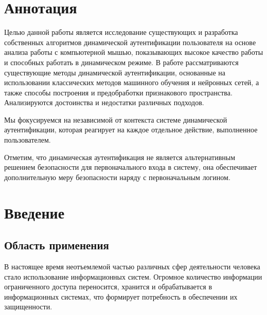 \documentclass[12pt]{article}
\begin{document}
    \setcounter{page}{2}  %

    \tableofcontents
    \newpage


    \onehalfspacing %


    \section{Аннотация}
    \label{sec:Annotation}

    \par Целью данной работы является исследование существующих и разработка собственных алгоритмов динамической аутентификации пользователя на основе анализа работы с компьютерной мышью, показывающих высокое качество работы и способных работать в динамическом режиме. В работе рассматриваются существующие методы динамической аутентификации, основанные на использовании классических методов машинного обучения и нейронных сетей, а также способы построения и предобработки признакового пространства. Анализируются достоинства и недостатки различных подходов.

    \par Мы фокусируемся на независимой от контекста системе динамической аутентификации, которая реагирует на каждое отдельное действие, выполненное пользователем.

    \par Отметим, что динамическая аутентификация не является альтернативным решением безопасности для первоначального входа в систему, она обеспечивает дополнительную меру безопасности наряду с первоначальным логином.

    \newpage



    \section{Введение}
    \label{sec:Intro}

    \subsection{Область применения}
    \label{sec:Intro:ApplicationArea}

    \par В настоящее время неотъемлемой частью различных сфер деятельности человека стало использование информационных систем. Огромное количество информации ограниченного доступа переносится, хранится и обрабатывается в информационных системах, что формирует потребность в обеспечении их защищенности.
\end{document}
